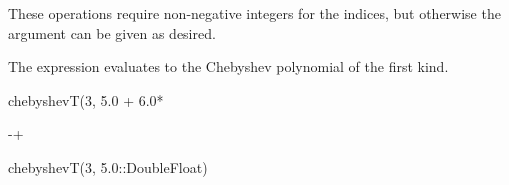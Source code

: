 {{{{{{{{{{{%
\begin{xtc}
\begin{xtccomment}
These operations require non-negative integers for the indices, but otherwise
the argument can be given as desired.
\end{xtccomment}
\begin{spadsrc}
\end{spadsrc}
\begin{TeXOutput}
\begin{fricasmath}{7}
%
\end{fricasmath}
\end{TeXOutput}
\end{xtc}
\begin{xtc}
\begin{xtccomment}
The expression  evaluates to the  Chebyshev
polynomial of the first kind.
\end{xtccomment}
\begin{spadsrc}
chebyshevT(3, 5.0 + 6.0*%
\end{spadsrc}
\begin{TeXOutput}
\begin{fricasmath}{8}
-{}+\TIMES \ImaginaryI %
\end{fricasmath}
\end{TeXOutput}
\end{xtc}
\begin{xtc}
\begin{xtccomment}
\end{xtccomment}
\begin{spadsrc}
chebyshevT(3, 5.0::DoubleFloat)
\end{spadsrc}
\begin{TeXOutput}
\begin{fricasmath}{9}
%
\end{fricasmath}
\end{TeXOutput}
\end{xtc}
\begin{xtc}
\begin{xtccomment}

\end{xtccomment}
\end{xtc}}}}}}}}}}}}
